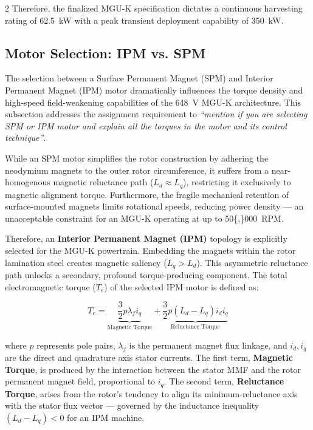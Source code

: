 \begin{multicols}{2}
Therefore, the finalized MGU-K specification dictates a continuous harvesting rating of \SI{62.5}{kW} with a peak transient deployment capability of \SI{350}{kW}.

\subsection{Motor Selection: IPM vs. SPM}

The selection between a Surface Permanent Magnet (SPM) and Interior Permanent Magnet (IPM) motor dramatically influences the torque density and high-speed field-weakening capabilities of the \SI{648}{V} MGU-K architecture. This subsection addresses the assignment requirement to \textit{``mention if you are selecting SPM or IPM motor and explain all the torques in the motor and its control technique''}.

While an SPM motor simplifies the rotor construction by adhering the neodymium magnets to the outer rotor circumference, it suffers from a near-homogenous magnetic reluctance path ($L_d \approx L_q$), restricting it exclusively to magnetic alignment torque. Furthermore, the fragile mechanical retention of surface-mounted magnets limits rotational speeds, reducing power density --- an unacceptable constraint for an MGU-K operating at up to \SI{50{,}000}{RPM}.

Therefore, an \textbf{Interior Permanent Magnet (IPM)} topology is explicitly selected for the MGU-K powertrain. Embedding the magnets within the rotor lamination steel creates magnetic saliency ($L_q > L_d$). This asymmetric reluctance path unlocks a secondary, profound torque-producing component. The total electromagnetic torque ($T_e$) of the selected IPM motor is defined as:

\begin{equation} \label{eq:ipm_torque}
T_e = \underbrace{\frac{3}{2} p \lambda_f i_q}_{\text{Magnetic Torque}} + \underbrace{\frac{3}{2} p (L_d - L_q) i_d i_q}_{\text{Reluctance Torque}}
\end{equation}

where $p$ represents pole pairs, $\lambda_f$ is the permanent magnet flux linkage, and $i_d, i_q$ are the direct and quadrature axis stator currents. The first term, \textbf{Magnetic Torque}, is produced by the interaction between the stator MMF and the rotor permanent magnet field, proportional to $i_q$. The second term, \textbf{Reluctance Torque}, arises from the rotor's tendency to align its minimum-reluctance axis with the stator flux vector --- governed by the inductance inequality $(L_d - L_q) < 0$ for an IPM machine.


\end{multicols}
